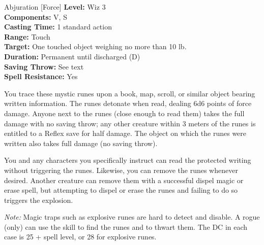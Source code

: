 {Abjuration [Force]}
{
	\textbf{Level:}
	Wiz 3\\
	\textbf{Components:}
	V, S\\
	\textbf{Casting Time:}
	1 standard action\\
	\textbf{Range:}
	Touch\\
	\textbf{Target:}
	One touched object weighing no more than 10 lb.\\
	\textbf{Duration:}
	Permanent until discharged (D)\\
	\textbf{Saving Throw:}
	See text\\
	\textbf{Spell Resistance:}
	Yes\\
}
{
	You trace these mystic runes upon a book, map, scroll, or similar object bearing written information. The runes detonate when read, dealing 6d6 points of force damage. Anyone next to the runes (close enough to read them) takes the full damage with no saving throw; any other creature within 3 meters of the runes is entitled to a Reflex save for half damage. The object on which the runes were written also takes full damage (no saving throw).

	You and any characters you specifically instruct can read the protected writing without triggering the runes. Likewise, you can remove the runes whenever desired. Another creature can remove them with a successful dispel magic or erase spell, but attempting to dispel or erase the runes and failing to do so triggers the explosion.

	\textit{Note:} Magic traps such as explosive runes are hard to detect and disable. A rogue (only) can use the  skill to find the runes and  to thwart them. The DC in each case is 25 + spell level, or 28 for explosive runes.

}
